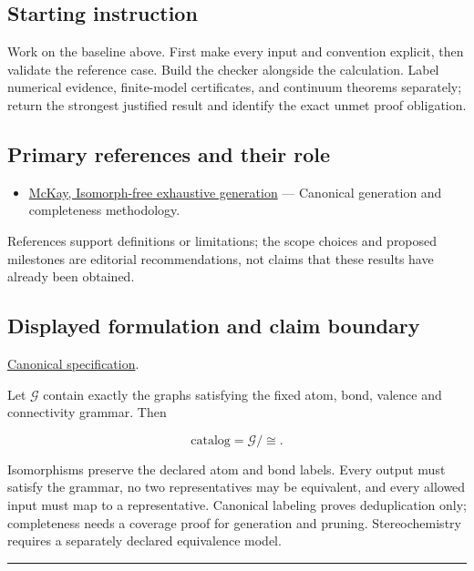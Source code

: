\documentclass[
  11pt,
]{article}
\providecommand{\tightlist}{%
  \setlength{\itemsep}{0pt}\setlength{\parskip}{0pt}}
\begin{document}
\subsection{Starting instruction}

Work on the baseline above. First make every input and convention
explicit, then validate the reference case. Build the checker alongside
the calculation. Label numerical evidence, finite-model certificates,
and continuum theorems separately; return the strongest justified result
and identify the exact unmet proof obligation.

\subsection{Primary references and their role}

\begin{itemize}
\tightlist
\item
  \href{https://users.cecs.anu.edu.au/~bdm/papers/orderly.pdf}{McKay,
  Isomorph-free exhaustive generation} --- Canonical generation and
  completeness methodology.
\end{itemize}

References support definitions or limitations; the scope choices and
proposed milestones are editorial recommendations, not claims that these
results have already been obtained.

\subsection{Displayed formulation and claim boundary}

\href{https://github.com/rick-stevens-ai/Pure-Thought/blob/main/PRDs/17-Isomer-Enumeration-Molecular-Graphs.md}{Canonical
specification}.

Let \(\mathcal G\) contain exactly the graphs satisfying the fixed atom,
bond, valence and connectivity grammar. Then

\[\text{catalog}=\mathcal G/\!\cong.\]

Isomorphisms preserve the declared atom and bond labels. Every output
must satisfy the grammar, no two representatives may be equivalent, and
every allowed input must map to a representative. Canonical labeling
proves deduplication only; completeness needs a coverage proof for
generation and pruning. Stereochemistry requires a separately declared
equivalence model.

\begin{center}\rule{0.5\linewidth}{0.5pt}\end{center}
\end{document}
